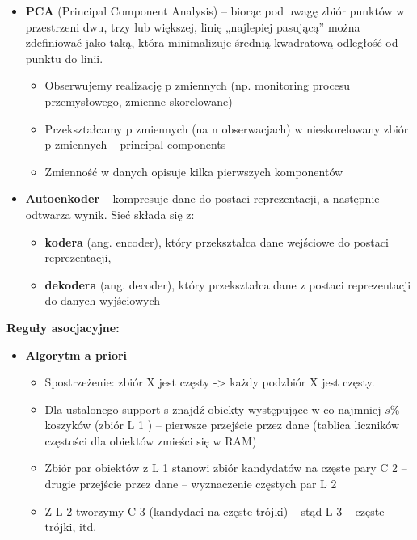 \begin{itemize}
	\item \textbf{PCA} (Principal Component Analysis) – biorąc pod uwagę zbiór punktów w przestrzeni dwu, trzy lub większej, linię „najlepiej pasującą” można zdefiniować jako taką, która minimalizuje średnią kwadratową odległość od punktu do linii.
	\begin{itemize}
		\item Obserwujemy realizację p zmiennych (np. monitoring procesu przemysłowego, zmienne skorelowane)
		\item Przekształcamy p zmiennych (na n obserwacjach) w nieskorelowany zbiór p zmiennych – principal components
		\item Zmienność w danych opisuje kilka pierwszych komponentów
	\end{itemize}
	\item \textbf{Autoenkoder} – kompresuje dane do postaci reprezentacji, a następnie odtwarza wynik. Sieć składa się z:
	\begin{itemize}
		\item \textbf{kodera} (ang. encoder), który przekształca dane wejściowe do postaci reprezentacji,
		\item \textbf{dekodera} (ang. decoder), który przekształca dane z postaci reprezentacji do danych wyjściowych
	\end{itemize}
\end{itemize}

\textbf{Reguły asocjacyjne:}\\

\begin{itemize}
	\item \textbf{Algorytm a priori}
	\begin{itemize}
		\item Spostrzeżenie: zbiór X jest częsty -> każdy podzbiór X jest częsty.
		\item Dla ustalonego support s znajdź obiekty występujące w co najmniej $s\%$ koszyków (zbiór L 1 ) – pierwsze przejście przez dane (tablica liczników częstości dla obiektów zmieści się w RAM)
		\item Zbiór par obiektów z L 1 stanowi zbiór kandydatów na częste pary C 2 – drugie przejście przez dane – wyznaczenie częstych par L 2
		\item Z L 2 tworzymy C 3 (kandydaci na częste trójki) – stąd L 3 – częste trójki, itd.
	\end{itemize}
\end{itemize}

